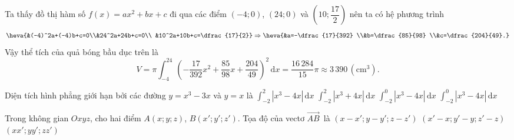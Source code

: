 \begin{bt}
{\begin{center}
		\end{center}Ta thấy đồ thị hàm số $f(x)=ax^2+bx+c$ đi qua các điểm $(-4;0)$, $(24;0)$ và $\left(10;\dfrac{17}{2}\right)$ nên ta có
		hệ phương trình 
		\[\heva{&(-4)^2a+(-4)b+c=0\\&24^2a+24b+c=0\\ &10^2a+10b+c=\dfrac{17}{2}}\Rightarrow \heva{&a=-\dfrac{17}{392}  \\&b=\dfrac{85}{98} \\&c=\dfrac{204}{49}.}\]
		Vậy thể tích của quả  bóng bầu dục trên là
	\[V=\pi\displaystyle\int_{-4}^{24} \left(-\dfrac{17}{392}x^2+\dfrac{85}{98}x+\dfrac{204}{49}\right)^2 \mathrm{\,d}x=\dfrac{16\,284}{15}\pi \approx 3\,390\,(\text{cm}^3).\]} 
\end{bt}

\begin{ex}%
	Diện tích hình phẳng giới hạn  bởi các đường $y = x^3 - 3x$ và $y = x$ là
	 \choice
		{\True $\displaystyle\int_{-2}^{2} |x^3 -  4x| \mathrm{\,d}x$}
		{$\displaystyle\int_{-2}^{2} |x^3 + 4x|  \mathrm{\,d}x$}
		{$\displaystyle\int_{-2}^{0} |x^3 -  4x| \mathrm{\,d}x$}
		{$\displaystyle\int_{-2}^{0} |x^3 - 4x|  \mathrm{\,d}x$}
\end{ex}

\begin{ex}%
	Trong không gian $Oxyz$, cho hai điểm $A(x;  y; z)$, $B\left(x'; y'; z'\right)$. Tọa độ của vectơ $\overrightarrow{AB}$~là
		 {$\left(x-x'; y-y'; z-z'\right)$}
		{\True  $\left(x'-x; y'-y; z'-z\right)$}
		{$\left(x x'; y y';  z z'\right)$}
\end{ex}

